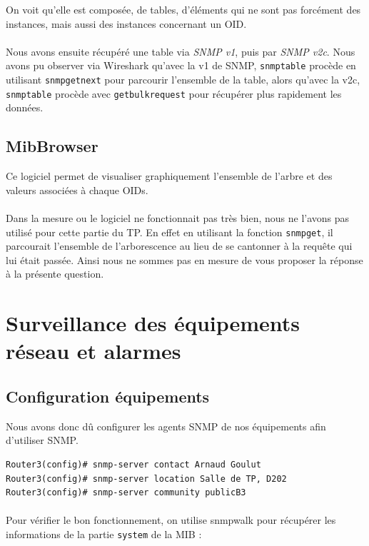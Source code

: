 \documentclass[12pt,a4paper,notitlepage]{article}
\begin{document}
On voit qu'elle est composée, de tables, d'éléments qui ne sont pas forcément des instances, mais aussi des instances concernant un OID.

\paragraph{}Nous avons ensuite récupéré une table via \textit{SNMP v1}, puis par \textit{SNMP v2c}. Nous avons pu observer via Wireshark qu'avec la v1 de SNMP, \texttt{snmptable} procède en utilisant \texttt{snmpgetnext} pour parcourir l'ensemble de la table, alors qu'avec la v2c, \texttt{snmptable} procède avec \texttt{getbulkrequest} pour récupérer plus rapidement les données.

\subsection{MibBrowser}
Ce logiciel permet de visualiser graphiquement l'ensemble de l'arbre et des valeurs associées à chaque OIDs.

\paragraph{}Dans la mesure ou le logiciel ne fonctionnait pas très bien, nous ne l'avons pas utilisé pour cette partie du TP. En effet en utilisant la fonction \texttt{snmpget}, il parcourait l'ensemble de l'arborescence au lieu de se cantonner à la requête qui lui était passée. Ainsi nous ne sommes pas en mesure de vous proposer la réponse à la présente question.

\section{Surveillance des équipements réseau et alarmes}
\subsection{Configuration équipements}
Nous avons donc dû configurer les agents SNMP de nos équipements afin d'utiliser SNMP.\\
\begin{lstlisting}[title=Commandes Cisco pour configurer l'agent SNMP du routeur]
Router3(config)# snmp-server contact Arnaud Goulut
Router3(config)# snmp-server location Salle de TP, D202
Router3(config)# snmp-server community publicB3
\end{lstlisting}

\paragraph{} Pour vérifier le bon fonctionnement, on utilise snmpwalk pour récupérer les informations de la partie \texttt{system} de la MIB :
\end{document}
